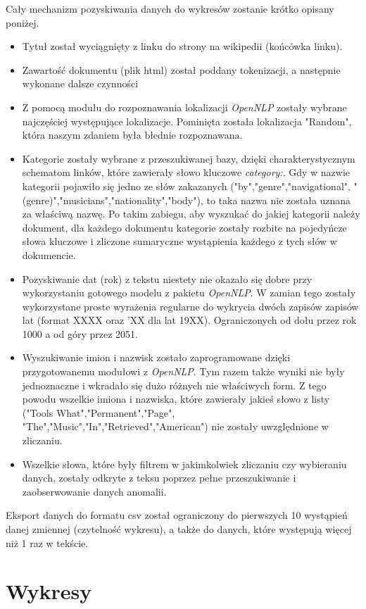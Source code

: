 \documentclass[journal]{IEEEtran}
\begin{document}
Cały mechanizm pozyskiwania danych do wykresów zostanie krótko opisany poniżej.
\begin{itemize}
\item Tytuł został wyciągnięty z linku do strony na wikipedii (końcówka linku).
\item Zawartość dokumentu (plik html) został poddany tokenizacji, a następnie wykonane dalsze czynności
\item Z pomocą modułu do rozpoznawania lokalizacji \textit{OpenNLP}
zostały wybrane najczęściej występujące lokalizacje. Pominięta została lokalizacja "Random",
która naszym zdaniem była błednie rozpoznawana.
\item Kategorie zostały wybrane z przeszukiwanej bazy, dzięki charakterystycznym
schematom linków, które zawierały słowo kluczowe \textit{category:}.
Gdy w nazwie kategorii pojawiło się jedno ze słów zakazanych ("by","genre","navigational",
"(genre)","musicians","nationality","body"), to taka nazwa nie została uznana za właściwą nazwę.
Po takim zabiegu, aby wyszukać do jakiej kategorii należy dokument, dla każdego dokumentu
kategorie zostały rozbite na pojedyńcze słowa kluczowe i zliczone
sumaryczne wystąpienia każdego z tych słów w dokumencie.
\item Pozyskiwanie dat (rok) z tekstu niestety nie okazało się dobre przy wykorzystaniu gotowego modelu
z pakietu \textit{OpenNLP}. W zamian tego zostały wykorzystane proste wyrażenia regularne
do wykrycia dwóch zapisów zapisów lat (format XXXX oraz 'XX dla lat 19XX).
Ograniczonych od dołu przez rok 1000 a od góry przez 2051.
\item Wyszukiwanie imion i nazwisk zostało zaprogramowane dzięki  przygotowanemu modułowi z \textit{OpenNLP}.
Tym razem także wyniki nie były jednoznaczne i wkradało się dużo różnych nie właściwych form. Z tego powodu
wszelkie imiona i nazwiska, które zawierały jakieś słowo z listy ("Tools What","Permanent","Page",
"The","Music","In","Retrieved","American") nie zostały uwzględnione w zliczaniu.
\item Wszelkie słowa, które były filtrem w jakimkolwiek zliczaniu czy wybieraniu danych, zostały odkryte
z teksu poprzez pełne przeszukiwanie i zaobserwowanie danych anomalii.
\end{itemize}

Eksport danych do formatu csv został ograniczony do pierwszych 10 wystąpień danej zmiennej (czytelność wykresu),
a także do danych, które występują więcej niż 1 raz w tekście.

\section{Wykresy}
\end{document}
